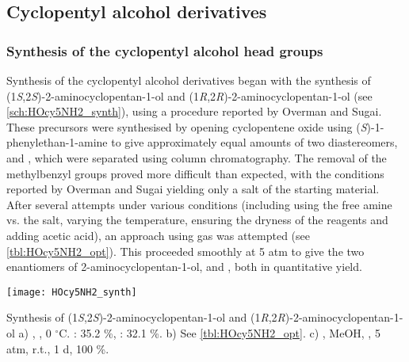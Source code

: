 \subsection{Cyclopentyl alcohol derivatives}

\subsubsection{Synthesis of the cyclopentyl alcohol head groups }

Synthesis of the cyclopentyl alcohol derivatives began with the synthesis of (1\textit{S},2\textit{S})-2-aminocyclopentan-1-ol  and (1\textit{R},2\textit{R})-2-aminocyclopentan-1-ol  (see \ref{sch:HOcy5NH2_synth}), using a procedure reported by Overman and Sugai\cite{Aube1992,Overman1985,Overman1985a}.
These precursors were synthesised by opening cyclopentene oxide  using (\textit{S})-1-phenylethan-1-amine  to give approximately equal amounts of two diastereomers,  and , which were separated using column chromatography. 
The removal of the methylbenzyl groups proved more difficult than expected, with the conditions reported by Overman and Sugai\cite{Overman1985} yielding only a salt of the starting material.
After several attempts under various conditions (including using the free amine vs. the salt, varying the temperature, ensuring the dryness of the reagents and adding acetic acid), an approach using  gas was attempted (see \ref{tbl:HOcy5NH2_opt}). This proceeded smoothly at 5 atm to give the two enantiomers of 2-aminocyclopentan-1-ol,  and , both in quantitative yield.

\begin{scheme}[H]
	\begin{center}
		\texttt{[image: HOcy5NH2\_synth]}
		\caption{Synthesis of (1\textit{S},2\textit{S})-2-aminocyclopentan-1-ol  and (1\textit{R},2\textit{R})-2-aminocyclopentan-1-ol 
		a) , , 0 $^\circ$C.  : 35.2 \%,
		: 32.1 \%.
		b) See \ref{tbl:HOcy5NH2_opt}.
		c) , MeOH, , 5 atm, r.t., 1 d, 100 \%.
		\label{sch:HOcy5NH2_synth}}
	\end{center}
\end{scheme}


